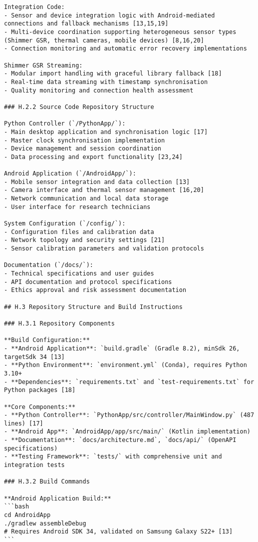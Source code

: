 \begin{verbatim}
Integration Code:
- Sensor and device integration logic with Android-mediated connections and fallback mechanisms [13,15,19]
- Multi-device coordination supporting heterogeneous sensor types (Shimmer GSR, thermal cameras, mobile devices) [8,16,20]
- Connection monitoring and automatic error recovery implementations

Shimmer GSR Streaming:
- Modular import handling with graceful library fallback [18]
- Real-time data streaming with timestamp synchronisation
- Quality monitoring and connection health assessment

### H.2.2 Source Code Repository Structure

Python Controller (`/PythonApp/`):
- Main desktop application and synchronisation logic [17]
- Master clock synchronisation implementation
- Device management and session coordination
- Data processing and export functionality [23,24]

Android Application (`/AndroidApp/`):
- Mobile sensor integration and data collection [13]
- Camera interface and thermal sensor management [16,20]
- Network communication and local data storage
- User interface for research technicians

System Configuration (`/config/`):
- Configuration files and calibration data
- Network topology and security settings [21]
- Sensor calibration parameters and validation protocols

Documentation (`/docs/`):
- Technical specifications and user guides
- API documentation and protocol specifications
- Ethics approval and risk assessment documentation

## H.3 Repository Structure and Build Instructions

### H.3.1 Repository Components

**Build Configuration:**
- **Android Application**: `build.gradle` (Gradle 8.2), minSdk 26, targetSdk 34 [13]
- **Python Environment**: `environment.yml` (Conda), requires Python 3.10+
- **Dependencies**: `requirements.txt` and `test-requirements.txt` for Python packages [18]

**Core Components:**
- **Python Controller**: `PythonApp/src/controller/MainWindow.py` (487 lines) [17]
- **Android App**: `AndroidApp/app/src/main/` (Kotlin implementation)
- **Documentation**: `docs/architecture.md`, `docs/api/` (OpenAPI specifications)
- **Testing Framework**: `tests/` with comprehensive unit and integration tests

### H.3.2 Build Commands

**Android Application Build:**
```bash
cd AndroidApp
./gradlew assembleDebug
# Requires Android SDK 34, validated on Samsung Galaxy S22+ [13]
```


\end{verbatim}
